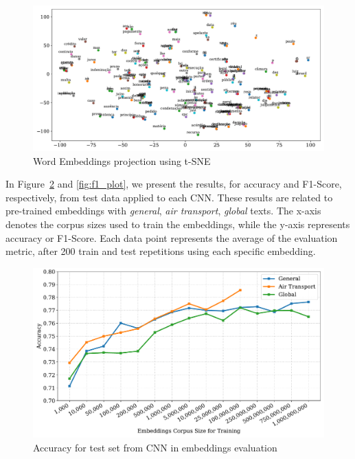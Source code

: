 \begin{figure}[tb]
    \centering
    \caption{Word Embeddings projection using t-SNE}
    \label{fig:projection}
    \includegraphics[width=\textwidth]{images/chapters/tsne_2000_0.1.pdf}
    
\end{figure}


In Figure~\ref{fig:accuracy_plot} and \ref{fig:f1_plot}, we present the results, for accuracy and F1-Score, respectively, from test data applied to each \gls{CNN}. These results are related to pre-trained embeddings  with \emph{general}, \emph{air transport}, \emph{global} texts. 
The x-axis denotes the corpus sizes used to train the embeddings, while the y-axis represents accuracy or F1-Score. Each data point represents the average of the evaluation metric, after 200 train and test repetitions using each specific embedding. %



\begin{figure}[htb]
    \centering
    \caption{Accuracy for test set from CNN in embeddings evaluation}
    \label{fig:accuracy_plot}
    \includegraphics[width=\textwidth]{images/chapters/acc_mean_final.pdf}
    
\end{figure}

